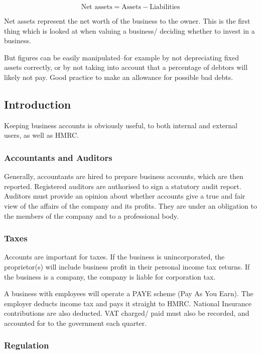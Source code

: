 \documentclass[
]{article}
\begin{document}
\[\text{Net assets} = \text{Assets} - \text{Liabilities}\]

Net assets represent the net worth of the business to the owner. This is
the first thing which is looked at when valuing a business/ deciding
whether to invest in a business.

But figures can be easily manipulated--for example by not depreciating
fixed assets correctly, or by not taking into account that a percentage
of debtors will likely not pay. Good practice to make an allowance for
possible bad debts.

\hypertarget{introduction}{%
\subsection{Introduction}\label{introduction}}

Keeping business accounts is obviously useful, to both internal and
external users, as well as HMRC.

\hypertarget{accountants-and-auditors}{%
\subsubsection{Accountants and
Auditors}\label{accountants-and-auditors}}

Generally, accountants are hired to prepare business accounts, which are
then reported. Registered auditors are authorised to sign a statutory
audit report. Auditors must provide an opinion about whether accounts
give a true and fair view of the affairs of the company and its profits.
They are under an obligation to the members of the company and to a
professional body.

\hypertarget{taxes}{%
\subsubsection{Taxes}\label{taxes}}

Accounts are important for taxes. If the business is unincorporated, the
proprietor(s) will include business profit in their personal income tax
returns. If the business is a company, the company is liable for
corporation tax.

A business with employees will operate a PAYE scheme (Pay As You Earn).
The employer deducts income tax and pays it straight to HMRC. National
Insurance contributions are also deducted. VAT charged/ paid must also
be recorded, and accounted for to the government each quarter.

\hypertarget{regulation}{%
\subsubsection{Regulation}\label{regulation}}
\end{document}
